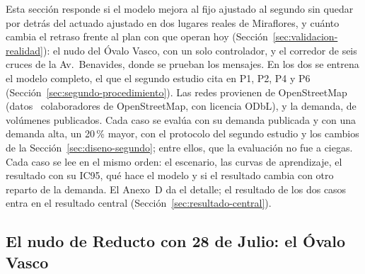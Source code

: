 Esta sección responde si el modelo mejora al fijo ajustado al segundo
sin quedar por detrás del actuado ajustado en dos lugares reales de
Miraflores, y cuánto cambia el retraso frente al plan con que operan hoy
(Sección~\ref{sec:validacion-realidad}): el nudo del Óvalo Vasco, con un
solo controlador, y el corredor de seis cruces de la Av.~Benavides,
donde se prueban los mensajes. En
los dos se entrena el modelo completo, el que el segundo estudio cita en
P1, P2, P4 y P6 (Sección~\ref{sec:segundo-procedimiento}). Las
redes provienen de OpenStreetMap (datos \textcopyright{}~colaboradores
de OpenStreetMap, con licencia ODbL), y la demanda, de volúmenes
publicados. Cada caso se evalúa con su demanda publicada y con una
demanda alta, un 20\,\% mayor, con el protocolo del segundo estudio y
los cambios de la Sección~\ref{sec:diseno-segundo}; entre ellos, que la
evaluación no fue a ciegas. Cada caso se lee en el mismo orden: el
escenario, las curvas de aprendizaje, el resultado con su IC95, qué hace
el modelo y si el resultado cambia con otro reparto de la demanda. El
Anexo~D da el detalle; el resultado de los dos casos entra en el
resultado central (Sección~\ref{sec:resultado-central}).

\subsection{El nudo de Reducto con 28 de Julio: el Óvalo Vasco}
\label{sec:lima-nudo}

